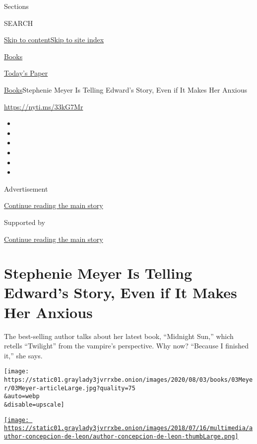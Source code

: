 Sections

SEARCH

\protect\hyperlink{site-content}{Skip to
content}\protect\hyperlink{site-index}{Skip to site index}

\href{https://www.nytimes3xbfgragh.onion/section/books}{Books}

\href{https://myaccount.nytimes3xbfgragh.onion/auth/login?response_type=cookie\&client_id=vi}{}

\href{https://www.nytimes3xbfgragh.onion/section/todayspaper}{Today's
Paper}

\href{/section/books}{Books}\textbar{}Stephenie Meyer Is Telling
Edward's Story, Even if It Makes Her Anxious

\href{https://nyti.ms/33kG7Mr}{https://nyti.ms/33kG7Mr}

\begin{itemize}
\item
\item
\item
\item
\item
\item
\end{itemize}

Advertisement

\protect\hyperlink{after-top}{Continue reading the main story}

Supported by

\protect\hyperlink{after-sponsor}{Continue reading the main story}

\hypertarget{stephenie-meyer-is-telling-edwards-story-even-if-it-makes-her-anxious}{%
\section{Stephenie Meyer Is Telling Edward's Story, Even if It Makes Her
Anxious}\label{stephenie-meyer-is-telling-edwards-story-even-if-it-makes-her-anxious}}

The best-selling author talks about her latest book, ``Midnight Sun,''
which retells ``Twilight'' from the vampire's perspective. Why now?
``Because I finished it,'' she says.

\texttt{[image: https://static01.graylady3jvrrxbe.onion/images/2020/08/03/books/03Meyer/03Meyer-articleLarge.jpg?quality=75\\\&auto=webp\\\&disable=upscale]}

\href{https://www.nytimes3xbfgragh.onion/by/concepcion-de-leon}{\texttt{[image: https://static01.graylady3jvrrxbe.onion/images/2018/07/16/multimedia/author-concepcion-de-leon/author-concepcion-de-leon-thumbLarge.png]}}

